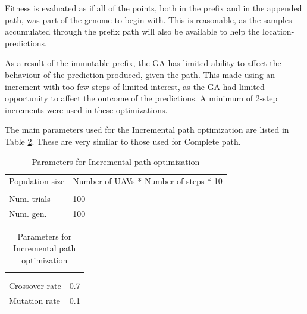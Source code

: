 \documentclass[10pt,a4paper]{book}
\begin{document}
Fitness is evaluated as if all of the points, both in the prefix and in the appended path, was part of the genome to begin with. This is reasonable, as the samples accumulated through the prefix path will also be available to help the location-predictions. 

As a result of the immutable prefix, the \gls{GA} has limited ability to affect the behaviour of the prediction produced, given the path. This made using an increment with too few steps of limited interest, as the \gls{GA} had limited opportunity to affect the outcome of the predictions. A minimum of 2-step increments were used in these optimizations.




The main parameters used for the Incremental path optimization are listed in Table \ref{TAB_INCR_PARAMS}. These are very similar to those used for Complete path.

\newpage

\begin{table}[H]
\centering
\caption{Parameters for Incremental path optimization}
\begin{minipage}{50mm}
\small
\begin{tabular}{l l}
Population size & Number of UAVs * Number of steps * 10   \\  
& \\
Num. trials & 100  \\
Num. gen. & 100  
\end{tabular}
\end{minipage}
\centering
\begin{minipage}{50mm}
\small
\begin{tabular}{l l}
& \\
& \\
Crossover rate & 0.7 \\ 
Mutation rate & 0.1 
\end{tabular}
\end{minipage}
\label{TAB_INCR_PARAMS}
\end{table}
\end{document}
